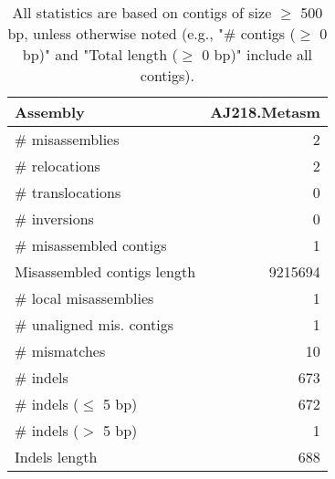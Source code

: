 \documentclass[12pt,a4paper]{article}
\begin{document}
\begin{table}[ht]
\begin{center}
\caption{All statistics are based on contigs of size $\geq$ 500 bp, unless otherwise noted (e.g., "\# contigs ($\geq$ 0 bp)" and "Total length ($\geq$ 0 bp)" include all contigs).}
\begin{tabular}{|l*{1}{|r}|}
\hline
Assembly & AJ218.Metasm \\ \hline
\# misassemblies & 2 \\ \hline
\hspace{5mm}\# relocations & 2 \\ \hline
\hspace{5mm}\# translocations & 0 \\ \hline
\hspace{5mm}\# inversions & 0 \\ \hline
\# misassembled contigs & 1 \\ \hline
Misassembled contigs length & 9215694 \\ \hline
\# local misassemblies & 1 \\ \hline
\# unaligned mis. contigs & 1 \\ \hline
\# mismatches & 10 \\ \hline
\# indels & 673 \\ \hline
\hspace{5mm}\# indels ($\leq$ 5 bp) & 672 \\ \hline
\hspace{5mm}\# indels ($>$ 5 bp) & 1 \\ \hline
Indels length & 688 \\ \hline
\end{tabular}
\end{center}
\end{table}
\end{document}
